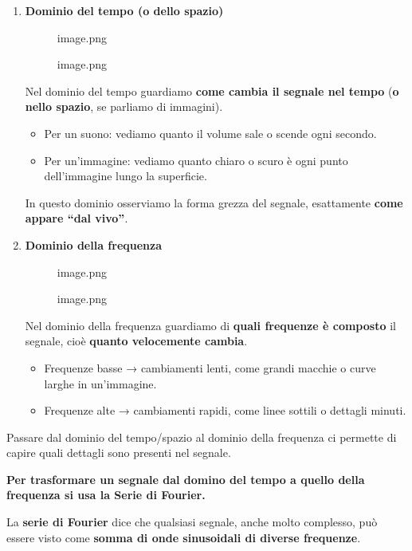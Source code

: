 \documentclass[
]{article}
\providecommand{\tightlist}{%
  \setlength{\itemsep}{0pt}\setlength{\parskip}{0pt}}
\begin{document}
\begin{enumerate}
\def\labelenumi{\arabic{enumi}.}
\item
  \textbf{Dominio del tempo (o dello spazio)}

  \begin{figure}
  \centering
  {image.png}
  \caption{image.png}
  \end{figure}

  Nel dominio del tempo guardiamo \textbf{come cambia il segnale nel tempo} (\textbf{o nello spazio}, se parliamo di immagini).

  \begin{itemize}
  \tightlist
  \item
    Per un suono: vediamo quanto il volume sale o scende ogni secondo.
  \item
    Per un'immagine: vediamo quanto chiaro o scuro è ogni punto dell'immagine lungo la superficie.
  \end{itemize}

  In questo dominio osserviamo la forma grezza del segnale, esattamente \textbf{come appare ``dal vivo''}.
\item
  \textbf{Dominio della frequenza}

  \begin{figure}
  \centering
  {image.png}
  \caption{image.png}
  \end{figure}

  Nel dominio della frequenza guardiamo di \textbf{quali frequenze è composto} il segnale, cioè \textbf{quanto velocemente cambia}.

  \begin{itemize}
  \tightlist
  \item
    Frequenze basse → cambiamenti lenti, come grandi macchie o curve larghe in un'immagine.
  \item
    Frequenze alte → cambiamenti rapidi, come linee sottili o dettagli minuti.
  \end{itemize}
\end{enumerate}

Passare dal dominio del tempo/spazio al dominio della frequenza ci permette di capire quali dettagli sono presenti nel segnale.

\textbf{Per trasformare un segnale dal domino del tempo a quello della frequenza si usa la Serie di Fourier.}

La \textbf{serie di Fourier} dice che qualsiasi segnale, anche molto complesso, può essere visto come \textbf{somma di onde sinusoidali di diverse frequenze}.
\end{document}
